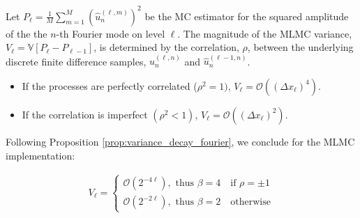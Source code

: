 \begin{proposition}
    \label{prop:variance_decay_fourier}
    Let $P_\ell = \frac{1}{M}\sum_{m=1}^M(\hat{u}_n^{(\ell,m)})^2$ 
    be the MC estimator for the squared amplitude 
    of the the $n$-th Fourier mode on level $\ell$. The magnitude of 
    the MLMC 
    variance, $V_\ell = \mathbb{V}[P_\ell - P_{\ell - 1}]$, is 
    determined by the correlation, $\rho$, between the underlying 
    discrete finite difference samples, 
    $\hat{u}_n^{(\ell, n)}$ and $\hat{u}_n^{(\ell-1, n)}$.
    \begin{itemize}
        \item If the processes are perfectly correlated ($\rho^2 = 1)$,
         $V_\ell = \mathcal{O}((\Delta x_\ell)^4)$.
        \item If the correlation is imperfect $(\rho^2 < 1)$, 
        $V_\ell = \mathcal{O}((\Delta x_\ell)^2)$.
    \end{itemize}
\end{proposition}

Following Proposition \ref{prop:variance_decay_fourier}, we conclude 
for the MLMC implementation:

\begin{align*}
    V_\ell = 
    \begin{cases}
        \mathcal{O}\left(2^{-4\ell}\right), \text{  thus } \beta = 4 \quad \text{if } \rho = \pm 1\\
        \mathcal{O}\left(2^{-2\ell}\right), \text{  thus } \beta = 2 \quad \text{otherwise}
    \end{cases}
\end{align*}

